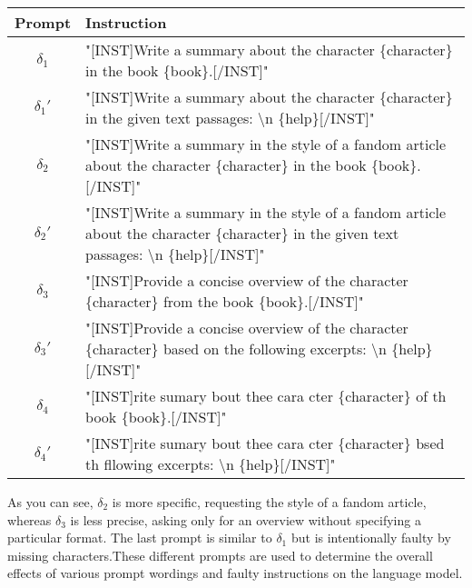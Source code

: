 \begin{center}
    \begin{tabular}{|c|m{10cm}|}
        \hline
        Prompt        & Instruction                                                                                                                                             \\ [0.5ex]
        \hline\hline
        $\delta_{1}$  & "[INST]Write a summary about the character \{character\} in the book \{book\}.[/INST]"                                                                  \\
        \hline
        $\delta_{1}'$ & "[INST]Write a summary about the character \{character\} in the given text passages: \textbackslash n \{help\}[/INST]"                                  \\
        \hline\hline
        $\delta_{2}$  & "[INST]Write a summary in the style of a fandom article about the character \{character\} in the book \{book\}.[/INST]"                                 \\
        \hline
        $\delta_{2}'$ & "[INST]Write a summary in the style of a fandom article about the character \{character\} in the given text passages: \textbackslash n \{help\}[/INST]" \\
        \hline\hline
        $\delta_{3}$  & "[INST]Provide a concise overview of the character \{character\} from the book \{book\}.[/INST]"                                                        \\
        \hline
        $\delta_{3}'$ & "[INST]Provide a concise overview of the character \{character\} based on the following excerpts: \textbackslash n \{help\}[/INST]"                     \\
        \hline\hline
        $\delta_{4}$  & "[INST]rite sumary bout thee cara cter \{character\} of th book \{book\}.[/INST]"                                                                       \\
        \hline
        $\delta_{4}'$ & "[INST]rite sumary bout thee cara cter \{character\} bsed th fllowing excerpts: \textbackslash n \{help\}[/INST]"                                       \\ [1ex]
        \hline
    \end{tabular}
\end{center}



As you can see, $\delta_{2}$ is more specific, requesting the style of a fandom article, whereas $\delta_{3}$ is less precise, asking only for an overview without specifying a particular format. The last prompt is similar to $\delta_{1}$ but is intentionally faulty by missing characters.These different prompts are used to determine the overall effects of various prompt wordings and faulty instructions on the language model.


